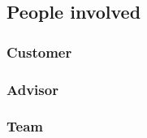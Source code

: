 \subsection{People involved}
	\subsubsection{Customer}
	\subsubsection{Advisor}
	\subsubsection{Team}
	


